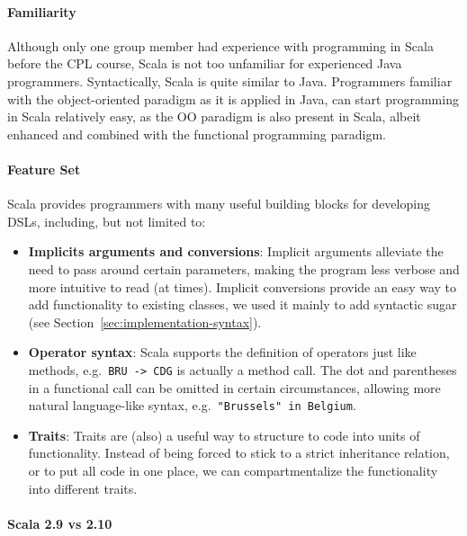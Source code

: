 \documentclass[a4paper]{article}
\renewcommand{\sc}[1]{\lstinline{#1}}
\begin{document}
\paragraph{Familiarity}
Although only one group member had experience with programming in Scala before the \textsc{CPL} course, Scala is not too unfamiliar for experienced Java programmers.
Syntactically, Scala is quite similar to Java.
Programmers familiar with the object-oriented paradigm as it is applied in Java, can start programming in Scala relatively easy, as the \textsc{OO} paradigm is also present in Scala, albeit enhanced and combined with the functional programming paradigm.

\paragraph{Feature Set}
Scala provides programmers with many useful building blocks for developing DSLs, including, but not limited to:

\begin{itemize}
\item \textbf{Implicits arguments and conversions}:
  Implicit arguments alleviate the need to pass around certain parameters, making the program less verbose and more intuitive to read (at times).
  Implicit conversions provide an easy way to add functionality to existing classes, we used it mainly to add syntactic sugar (see Section~\ref{sec:implementation-syntax}).
\item \textbf{Operator syntax}:
  Scala supports the definition of operators just like methods, e.g.\ \sc{BRU -> CDG} is actually a method call.
  The dot and parentheses in a functional call can be omitted in certain circumstances, allowing more natural language-like syntax, e.g.\ \sc{"Brussels" in Belgium}.
\item \textbf{Traits}:
  Traits are (also) a useful way to structure to code into units of functionality.
  Instead of being forced to stick to a strict inheritance relation, or to put all code in one place, we can compartmentalize the functionality into different traits.
\end{itemize}

\paragraph{Scala 2.9 vs 2.10}
\end{document}
